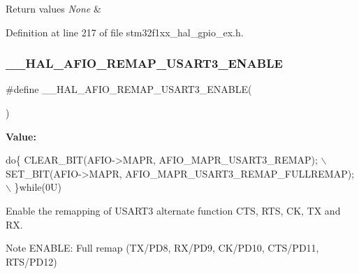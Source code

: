 \begin{DoxyRetVals}{Return values}
{\em None} & \\
\hline
\end{DoxyRetVals}


Definition at line 217 of file stm32f1xx\+\_\+hal\+\_\+gpio\+\_\+ex.\+h.

\mbox{\label{group___g_p_i_o_ex___a_f_i_o___a_f___r_e_m_a_p_p_i_n_g_gaed50d157afc9236c3f6cab368e6fa29b}} 
\subsubsection{\texorpdfstring{\+\_\+\+\_\+\+H\+A\+L\+\_\+\+A\+F\+I\+O\+\_\+\+R\+E\+M\+A\+P\+\_\+\+U\+S\+A\+R\+T3\+\_\+\+E\+N\+A\+B\+LE}{\_\_HAL\_AFIO\_REMAP\_USART3\_ENABLE}}
{\footnotesize\ttfamily \#define \+\_\+\+\_\+\+H\+A\+L\+\_\+\+A\+F\+I\+O\+\_\+\+R\+E\+M\+A\+P\+\_\+\+U\+S\+A\+R\+T3\+\_\+\+E\+N\+A\+B\+LE(\begin{DoxyParamCaption}{ }\end{DoxyParamCaption})}

{\bfseries Value\+:}
\begin{DoxyCode}
\textcolor{keywordflow}{do}\{ CLEAR\_BIT(AFIO->MAPR, AFIO\_MAPR\_USART3\_REMAP);            \(\backslash\)
                                              SET\_BIT(AFIO->MAPR, AFIO\_MAPR\_USART3\_REMAP\_FULLREMAP);    \(\backslash\)
                                            \}\textcolor{keywordflow}{while}(0U)
\end{DoxyCode}


Enable the remapping of U\+S\+A\+R\+T3 alternate function C\+TS, R\+TS, CK, TX and RX. 

\begin{DoxyNote}{Note}
E\+N\+A\+B\+LE\+: Full remap (T\+X/\+P\+D8, R\+X/\+P\+D9, C\+K/\+P\+D10, C\+T\+S/\+P\+D11, R\+T\+S/\+P\+D12) 
\end{DoxyNote}

